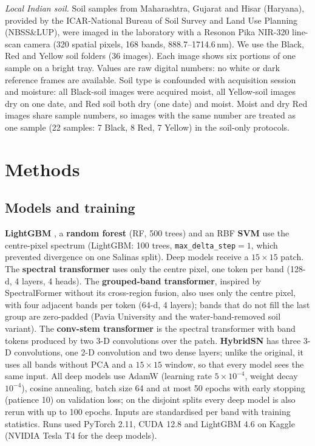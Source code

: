 \documentclass[]{interact}
\begin{document}
\emph{Local Indian soil.} Soil samples from Maharashtra, Gujarat and Hisar (Haryana), provided by the ICAR-National Bureau of Soil Survey and Land Use Planning (NBSS\&LUP), were imaged in the laboratory with a Resonon Pika NIR-320 line-scan camera (320 spatial pixels, 168 bands, 888.7--1714.6\,nm). We use the Black, Red and Yellow soil folders (36 images). Each image shows six portions of one sample on a bright tray. Values are raw digital numbers: no white or dark reference frames are available. Soil type is confounded with acquisition session and moisture: all Black-soil images were acquired moist, all Yellow-soil images dry on one date, and Red soil both dry (one date) and moist. Moist and dry Red images share sample numbers, so images with the same number are treated as one sample (22 samples: 7 Black, 8 Red, 7 Yellow) in the soil-only protocols.

\section{Methods}\label{sec:methods}


\subsection{Models and training}
\textbf{LightGBM} \citep{Ke2017}, a \textbf{random forest} (RF, 500 trees) and an RBF \textbf{SVM} use the centre-pixel spectrum (LightGBM: 100 trees, \texttt{max\_delta\_step}$=1$, which prevented divergence on one Salinas split). Deep models receive a $15\times15$ patch. The \textbf{spectral transformer} uses only the centre pixel, one token per band (128-d, 4 layers, 4 heads). The \textbf{grouped-band transformer}, inspired by SpectralFormer \citep{Hong2022} without its cross-region fusion, also uses only the centre pixel, with four adjacent bands per token (64-d, 4 layers); bands that do not fill the last group are zero-padded (Pavia University and the water-band-removed soil variant). The \textbf{conv-stem transformer} is the spectral transformer with band tokens produced by two 3-D convolutions over the patch. \textbf{HybridSN} \citep{Roy2020} has three 3-D convolutions, one 2-D convolution and two dense layers; unlike the original, it uses all bands without PCA and a $15\times15$ window, so that every model sees the same input. All deep models use AdamW (learning rate $5\times10^{-4}$, weight decay $10^{-4}$), cosine annealing, batch size 64 and at most 50 epochs with early stopping (patience 10) on validation loss; on the disjoint splits every deep model is also rerun with up to 100 epochs. Inputs are standardised per band with training statistics. Runs used PyTorch 2.11, CUDA 12.8 and LightGBM 4.6 on Kaggle (NVIDIA Tesla T4 for the deep models).
\end{document}
